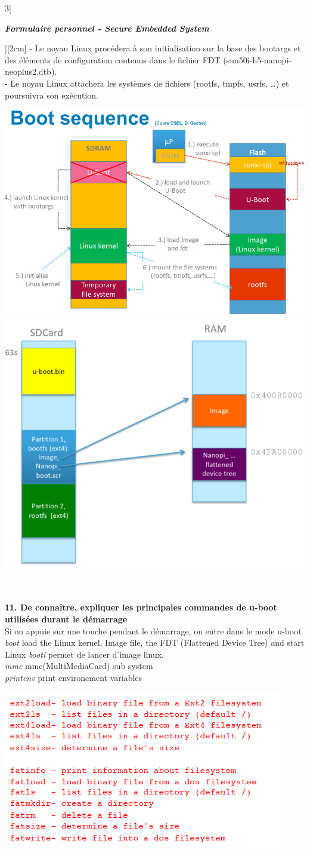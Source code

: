 \begin{multicols}{3}[\centerline{ \large\em \textbf{Formulaire personnel - Secure Embedded System}}][2cm]
- Le noyau Linux procédera à son initialisation sur la base des bootargs et des éléments de configuration contenus dans le fichier FDT (sun50i-h5-nanopi-neoplus2.dtb).\\
- Le noyau Linux attachera les systèmes de fichiers (rootfs, tmpfs, usrfs, …) et poursuivra son exécution.
\begin{minipage}{\linewidth}
	\centering
    \includegraphics[width =0.6\columnwidth]{images/4.png}
    \includegraphics[width =0.4\columnwidth]{images/38.png}
\end{minipage}\\
\\ \textbf{11. De connaître, expliquer les principales commandes de u-boot utilisées durant le démarrage\\}
Si on appuie sur une touche pendant le démarrage, on entre dans le mode u-boot\\
\textit{boot} load the Linux kernel, Image file, the FDT (Flattened Device Tree) and start Linux
\textit{booti} permet de lancer d'image linux.\\
\textit{mmc} mmc(MultiMediaCard) sub system\\
\textit{printenv} print environement variables\\
\begin{minipage}{\linewidth}
	\centering
    \includegraphics[width =0.6\columnwidth]{images/9.png}

\end{minipage}
\end{multicols}
